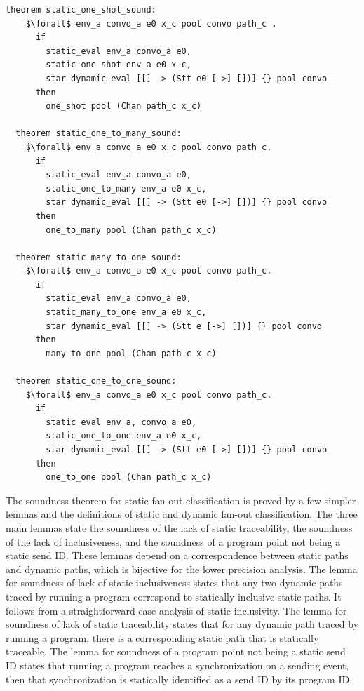 \documentclass{article}
\begin{document}
\begin{lstlisting}[language=logic, mathescape]
  theorem static_one_shot_sound: 
    $\forall$ env_a convo_a e0 x_c pool convo path_c .
      if
        static_eval env_a convo_a e0, 
        static_one_shot env_a e0 x_c, 
        star dynamic_eval [[] -> (Stt e0 [->] [])] {} pool convo
      then
        one_shot pool (Chan path_c x_c)

  theorem static_one_to_many_sound:
    $\forall$ env_a convo_a e0 x_c pool convo path_c. 
      if 
        static_eval env_a convo_a e0, 
        static_one_to_many env_a e0 x_c, 
        star dynamic_eval [[] -> (Stt e0 [->] [])] {} pool convo
      then
        one_to_many pool (Chan path_c x_c)

  theorem static_many_to_one_sound:
    $\forall$ env_a convo_a e0 x_c pool convo path_c. 
      if
        static_eval env_a convo_a e0, 
        static_many_to_one env_a e0 x_c, 
        star dynamic_eval [[] -> (Stt e [->] [])] {} pool convo
      then
        many_to_one pool (Chan path_c x_c)

  theorem static_one_to_one_sound:
    $\forall$ env_a convo_a e0 x_c pool convo path_c. 
      if
        static_eval env_a, convo_a e0, 
        static_one_to_one env_a e0 x_c,
        star dynamic_eval [[] -> (Stt e0 [->] [])] {} pool convo
      then
        one_to_one pool (Chan path_c x_c)
\end{lstlisting}

The soundness theorem for static fan-out classification is proved
by a few simpler lemmas and the
definitions of static and dynamic fan-out classification.  The three main lemmas state the
soundness of the lack of static traceability, the soundness of the lack of inclusiveness, and
the soundness of a program point not being a static send ID. These lemmas depend on a
correspondence between static paths and dynamic paths, which is bijective for the lower
precision analysis. The lemma for soundness of lack of static inclusiveness states that any two
dynamic paths traced by running a program correspond to statically inclusive static paths. It
follows from a straightforward case analysis of static inclusivity. The lemma for soundness of
lack of static traceability states that for any dynamic path traced by running a program, there
is a corresponding static path that is statically traceable. The lemma for soundness of a
program point not being a static send ID states that running a program reaches a
synchronization on a sending event, then that synchronization is statically identified as a
send ID by its program ID.
\end{document}

